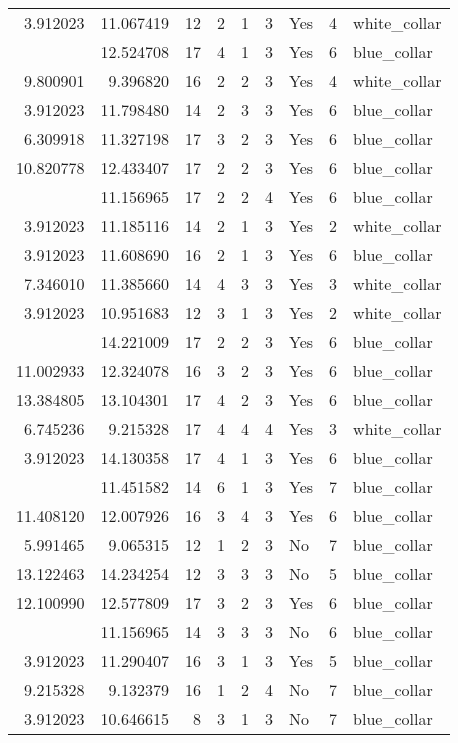 \documentclass[
]{article}
\begin{document}
\begin{longtable}[t]{rrrrrllrl}
3.912023 & 11.067419 & 12 & 2 & 1 & 3 & Yes & 4 & white\_collar\\
\addlinespace
3.912023 & 12.524708 & 17 & 4 & 1 & 3 & Yes & 6 & blue\_collar\\
9.800901 & 9.396820 & 16 & 2 & 2 & 3 & Yes & 4 & white\_collar\\
3.912023 & 11.798480 & 14 & 2 & 3 & 3 & Yes & 6 & blue\_collar\\
6.309918 & 11.327198 & 17 & 3 & 2 & 3 & Yes & 6 & blue\_collar\\
10.820778 & 12.433407 & 17 & 2 & 2 & 3 & Yes & 6 & blue\_collar\\
\addlinespace
9.396820 & 11.156965 & 17 & 2 & 2 & 4 & Yes & 6 & blue\_collar\\
3.912023 & 11.185116 & 14 & 2 & 1 & 3 & Yes & 2 & white\_collar\\
3.912023 & 11.608690 & 16 & 2 & 1 & 3 & Yes & 6 & blue\_collar\\
7.346010 & 11.385660 & 14 & 4 & 3 & 3 & Yes & 3 & white\_collar\\
3.912023 & 10.951683 & 12 & 3 & 1 & 3 & Yes & 2 & white\_collar\\
\addlinespace
13.122463 & 14.221009 & 17 & 2 & 2 & 3 & Yes & 6 & blue\_collar\\
11.002933 & 12.324078 & 16 & 3 & 2 & 3 & Yes & 6 & blue\_collar\\
13.384805 & 13.104301 & 17 & 4 & 2 & 3 & Yes & 6 & blue\_collar\\
6.745236 & 9.215328 & 17 & 4 & 4 & 4 & Yes & 3 & white\_collar\\
3.912023 & 14.130358 & 17 & 4 & 1 & 3 & Yes & 6 & blue\_collar\\
\addlinespace
3.912023 & 11.451582 & 14 & 6 & 1 & 3 & Yes & 7 & blue\_collar\\
11.408120 & 12.007926 & 16 & 3 & 4 & 3 & Yes & 6 & blue\_collar\\
5.991465 & 9.065315 & 12 & 1 & 2 & 3 & No & 7 & blue\_collar\\
13.122463 & 14.234254 & 12 & 3 & 3 & 3 & No & 5 & blue\_collar\\
12.100990 & 12.577809 & 17 & 3 & 2 & 3 & Yes & 6 & blue\_collar\\
\addlinespace
6.856462 & 11.156965 & 14 & 3 & 3 & 3 & No & 6 & blue\_collar\\
3.912023 & 11.290407 & 16 & 3 & 1 & 3 & Yes & 5 & blue\_collar\\
9.215328 & 9.132379 & 16 & 1 & 2 & 4 & No & 7 & blue\_collar\\
3.912023 & 10.646615 & 8 & 3 & 1 & 3 & No & 7 & blue\_collar\\

\end{longtable}
\end{document}
